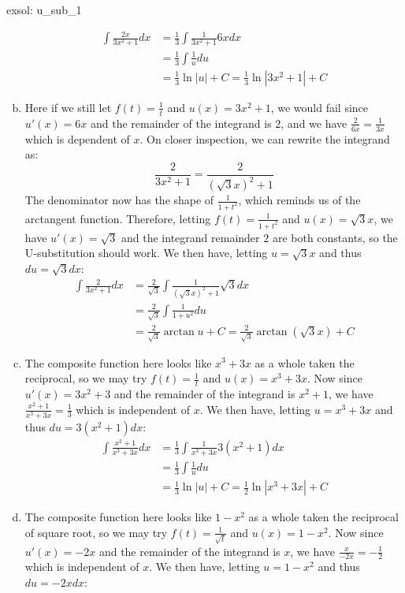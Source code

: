 \begin{exsol}[]{exsol: u_sub_1}
\begin{enumerate}[a)]
\begin{align*}
            \int \frac{2x}{3x^2 + 1} dx &= \frac{1}{3}\int \frac{1}{3x^2 + 1} 6xdx\\
            &= \frac{1}{3}\int \frac{1}{u} du\\
            &= \frac{1}{3}\ln |u| + C = \frac{1}{3} \ln |3x^2 + 1| + C
        \end{align*}
        \item Here if we still let $f(t) = \frac{1}{t}$ and $u(x) = 3x^2+1$, we would fail since  $u'(x) = 6x$ and the remainder of the integrand is $2$, and we have $\frac{2}{6x} = \frac{1}{3x}$ which is dependent of $x$.  On closer inspection, we can rewrite the integrand as:
        \[\frac{2}{3x^2+1} = \frac{2}{(\sqrt{3}x)^2 + 1}\]
        The denominator now has the shape of $\frac{1}{1+t^2}$, which reminds us of the arctangent function.  Therefore, letting $f(t) = \frac{1}{1+t^2}$ and $u(x) = \sqrt{3}x$, we have $u'(x) = \sqrt{3}$ and the integrand remainder $2$ are both constants, so the U-substitution should work.  We then have, letting $u = \sqrt{3}x$ and thus $du = \sqrt{3}dx$:
        \begin{align*}
            \int \frac{2}{3x^2+1} dx &= \frac{2}{\sqrt{3}}\int \frac{1}{(\sqrt{3}x)^2 + 1} \sqrt{3}dx\\
            &= \frac{2}{\sqrt{3}}\int \frac{1}{1+u^2} du\\
            &= \frac{2}{\sqrt{3}} \arctan u + C = \frac{2}{\sqrt{3}} \arctan(\sqrt{3}x) + C
        \end{align*}
        \item The composite function here looks like $x^3+3x$ as a whole taken the reciprocal, so we may try $f(t) = \frac{1}{t}$ and $u(x) = x^3+3x$.  Now since $u'(x) = 3x^2+3$ and the remainder of the integrand is $x^2+1$, we have $\frac{x^2+1}{x^3+3x} = \frac{1}{3}$ which is independent of $x$.  We then have, letting $u = x^3 + 3x$ and thus $du = 3(x^2 + 1)dx$:
        \begin{align*}
            \int \frac{x^2+1}{x^3+3x} dx &= \frac{1}{3}\int \frac{1}{x^3+3x} 3(x^2+1)dx\\
            &= \frac{1}{3}\int \frac{1}{u} du\\
            &= \frac{1}{3} \ln |u| + C = \frac{1}{2} \ln|x^3+3x| + C
        \end{align*}
        \item The composite function here looks like $1-x^2$ as a whole taken the reciprocal of square root, so we may try $f(t) = \frac{1}{\sqrt{t}}$ and $u(x) = 1-x^2$.  Now since $u'(x) = -2x$ and the remainder of the integrand is $x$, we have $\frac{x}{-2x} = -\frac{1}{2}$ which is independent of $x$.  We then have, letting $u = 1-x^2$ and thus $du = -2xdx$:

\end{enumerate}
\end{exsol}
